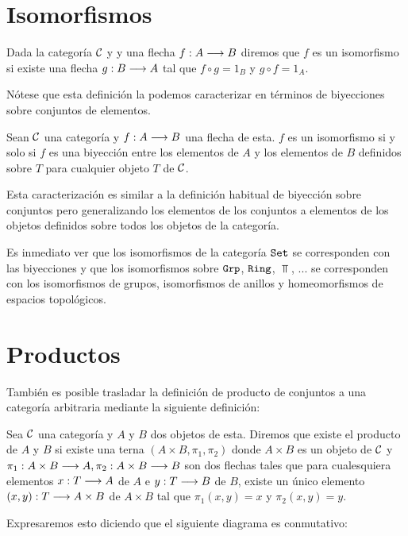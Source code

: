 \section{Isomorfismos}
\begin{definition}
Dada la categoría $\mathcal{C}$ y y una flecha $f: A\longrightarrow B$ diremos que
$f$ es un isomorfismo si existe una flecha $g: B\longrightarrow A$
tal que $f \circ g = 1_B$ y $g \circ f = 1_A$.
\end{definition}
Nótese que esta definición la podemos caracterizar en términos
de biyecciones sobre conjuntos de elementos.
\begin{proposition}
Sean $\mathcal{C}$ una categoría y $f: A\longrightarrow B$ una flecha de esta.
$f$ es un isomorfismo si y solo si $f$ es una biyección entre
los elementos de $A$ y los elementos de $B$ definidos sobre $T$
para cualquier objeto $T$ de $\mathcal{C}$.
\end{proposition}
Esta caracterización es similar a la definición habitual
de biyección sobre conjuntos pero generalizando los elementos de
los conjuntos a elementos de los objetos definidos sobre todos
los objetos
de la categoría.

Es inmediato ver
que los isomorfismos de la categoría $\texttt{Set}$ se corresponden con las
biyecciones y que los isomorfismos sobre $\texttt{Grp}$, $\texttt{Ring}$, $\Top$, ...
se corresponden con los isomorfismos de grupos,
isomorfismos de anillos y homeomorfismos de espacios topológicos.

\section{Productos}
También es posible trasladar la definición de producto de conjuntos
a una categoría arbitraria mediante la siguiente definición:

\begin{definition}
Sea $\mathcal{C}$ una categoría y $A$ y $B$ dos objetos de esta. Diremos que
existe el producto de $A$ y $B$ si
existe una terna $(A\times B, \pi_1, \pi_2)$
donde $A\times B$ es un objeto de $\mathcal{C}$ y
$\pi_1 : A\times B\longrightarrow A, \pi_2 : A\times B\longrightarrow B$ son dos flechas tales
que para cualesquiera elementos $x : T\longrightarrow A$ de $A$ e
$y: T\longrightarrow B$ de $B$, existe un único elemento
$(x,y): T\longrightarrow A\times B$ de $A\times B$ tal que $\pi_1 (x,y)=x$ y $\pi_2(x,y)=y$.

Expresaremos esto diciendo que  el siguiente diagrama es conmutativo:
\begin{center}
\end{center}

\end{definition}

